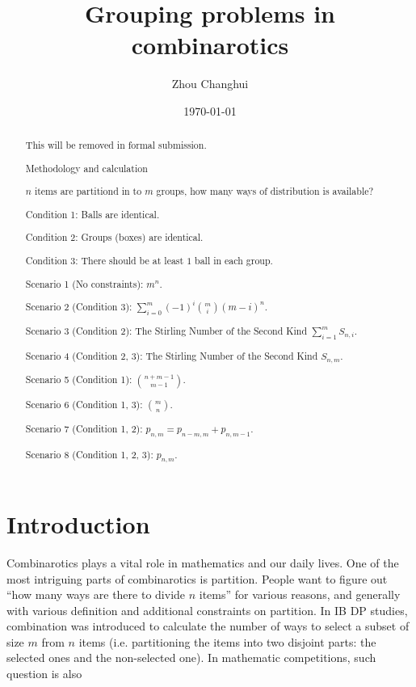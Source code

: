 \documentclass[a4paper]{article}
\begin{document}
\begin{titlepage}
    \title{\textbf{Grouping problems in combinarotics}}
    \author{Zhou Changhui}
    \date{\today}
    \maketitle
\end{titlepage}

\begin{abstract}

This will be removed in formal submission.

Methodology and calculation

$n$ items are partitiond in to $m$ groups, how many ways of distribution is available?

Condition 1: Balls are identical.

Condition 2: Groups (boxes) are identical.

Condition 3: There should be at least $1$ ball in each group.

Scenario 1 (No constraints): $m^n$.

Scenario 2 (Condition 3): $\sum_{i=0}^{m}(-1)^{i}{m\choose i}(m-i)^{n}$.

Scenario 3 (Condition 2): The Stirling Number of the Second Kind $\sum_{i=1}^{m}S_{n,i}$.

Scenario 4 (Condition 2, 3): The Stirling Number of the Second Kind $S_{n,m}$.

Scenario 5 (Condition 1): ${n+m-1\choose m-1}$.

Scenario 6 (Condition 1, 3): ${m\choose n}$.

Scenario 7 (Condition 1, 2): $p_{n,m} = p_{n-m, m} + p_{n, m-1}$.

Scenario 8 (Condition 1, 2, 3): $p_{n, m}$.
    
\end{abstract}

\section{Introduction}

Combinarotics plays a vital role in mathematics and our daily lives. One of the most intriguing parts of combinarotics is partition. People want to figure out ``how many ways are there to divide $n$ items'' for various reasons, and generally with various definition and additional constraints on partition. In IB DP studies, combination was introduced to calculate the number of ways to select a subset of size $m$ from $n$ items (i.e. partitioning the items into two disjoint parts: the selected ones and the non-selected one). In mathematic competitions, such question is also 
\end{document}
